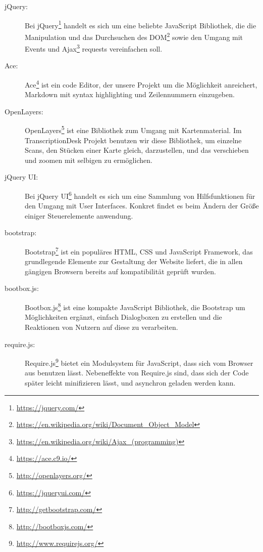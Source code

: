 \documentclass{article}
\begin{document}
\begin{description}
\item[jQuery:]
    Bei jQuery\footnote{\url{https://jquery.com/}} handelt es sich um eine beliebte JavaScript Bibliothek,
    die die Manipulation und das Durchsuchen des DOM\footnote{\url{https://en.wikipedia.org/wiki/Document_Object_Model}} sowie
    den Umgang mit Events und Ajax\footnote{\url{https://en.wikipedia.org/wiki/Ajax_(programming)}} requests vereinfachen soll.
\item[Ace:]
    Ace\footnote{\url{https://ace.c9.io/}} ist ein code Editor, der unsere Projekt um die Möglichkeit anreichert,
    Markdown mit syntax highlighting und Zeilennummern einzugeben.
\item[OpenLayers:]
    OpenLayers\footnote{\url{http://openlayers.org/}} ist eine Bibliothek zum Umgang mit Kartenmaterial.
    Im TranscriptionDesk Projekt benutzen wir diese Bibliothek,
    um einzelne Scans, den Stücken einer Karte gleich, darzustellen,
    und das verschieben und zoomen mit selbigen zu ermöglichen.
\item[jQuery UI:]
    Bei jQuery UI\footnote{\url{https://jqueryui.com/}} handelt es sich um eine Sammlung von Hilfsfunktionen für den Umgang mit User Interfaces.
    Konkret findet es beim Ändern der Größe einiger Steuerelemente anwendung.
\item[bootstrap:]
    Bootstrap\footnote{\url{http://getbootstrap.com/}} ist ein populäres HTML, CSS und JavaScript Framework,
    das grundlegende Elemente zur Gestaltung der Website liefert, die in allen gängigen Browsern bereits auf kompatibilität geprüft wurden.
\item[bootbox.js:]
    Bootbox.js\footnote{\url{http://bootboxjs.com/}} ist eine kompakte JavaScript Bibliothek,
    die Bootstrap um Möglichkeiten ergänzt,
    einfach Dialogboxen zu erstellen und die Reaktionen von Nutzern auf diese zu verarbeiten.
\item[require.js:]
    Require.js\footnote{\url{http://www.requirejs.org/}} bietet ein Modulsystem für JavaScript,
    dass sich vom Browser aus benutzen lässt.
    Nebeneffekte von Require.js sind, dass sich der Code später leicht minifizieren lässt,
    und asynchron geladen werden kann.
\end{description}
\end{document}
